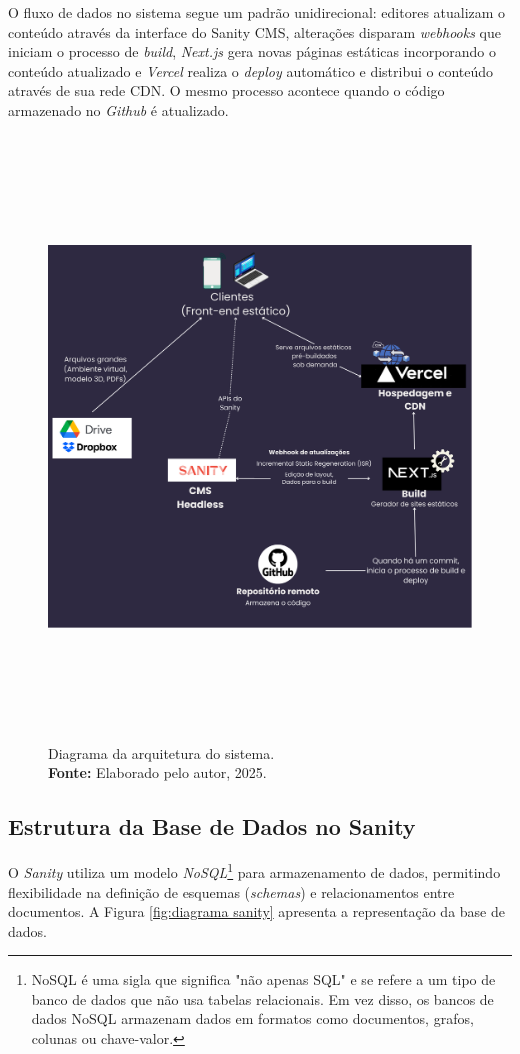      O fluxo de dados no sistema segue um padrão unidirecional: editores atualizam o conteúdo através da interface do Sanity CMS, alterações disparam \textit{webhooks} que iniciam o processo de \textit{build}, \textit{Next.js} gera novas páginas estáticas incorporando o conteúdo atualizado e \textit{Vercel} realiza o \textit{deploy} automático e distribui o conteúdo através de sua rede CDN. O mesmo processo acontece quando o código armazenado no \textit{Github} é atualizado.

    \begin{figure}[H]
        \centering
        \includegraphics[height=16cm, keepaspectratio]{img/arquitetura/arquitetura-arqueologia-formosa.png}
        \caption{ Diagrama da arquitetura do sistema. \\
            \textbf{Fonte:} Elaborado pelo autor, 2025.}
        \label{fig:arquitetura arqueologia formosa}
    \end{figure}
    
    \subsection{Estrutura da Base de Dados no Sanity}
     O \textit{Sanity} utiliza um modelo \textit{NoSQL}\footnote{NoSQL é uma sigla que significa "não apenas SQL" e se refere a um tipo de banco de dados que não usa tabelas relacionais. Em vez disso, os bancos de dados NoSQL armazenam dados em formatos como documentos, grafos, colunas ou chave-valor.} para armazenamento de dados, permitindo flexibilidade na definição de esquemas (\textit{schemas}) e relacionamentos entre documentos. A Figura \ref{fig:diagrama sanity} apresenta a representação da base de dados.

